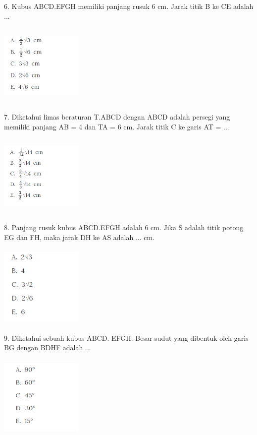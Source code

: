 \documentclass[11pt,fleqn]{book} %
\begin{document}
6. Kubus ABCD.EFGH memiliki panjang rusuk 6 cm. Jarak titik B ke CE adalah ...


\includegraphics[width = 4cm, height= 4cm]{Pictures/gi34.png}

7. Diketahui limas beraturan T.ABCD dengan ABCD adalah persegi yang memiliki panjang AB = 4 dan TA = 6 cm. Jarak titik C ke garis AT = ...

\includegraphics[width = 4cm, height= 4cm]{Pictures/gi35.png}

8. Panjang rusuk kubus ABCD.EFGH adalah 6 cm. Jika S adalah titik potong EG dan FH, maka jarak DH ke AS adalah ... cm.

\includegraphics[width = 4cm, height= 4cm]{Pictures/gi36.png}

9. Diketahui sebuah kubus ABCD. EFGH. Besar sudut yang dibentuk oleh garis BG dengan BDHF adalah ...

\includegraphics[width = 4cm, height= 4cm]{Pictures/gi37.png}
\end{document}
